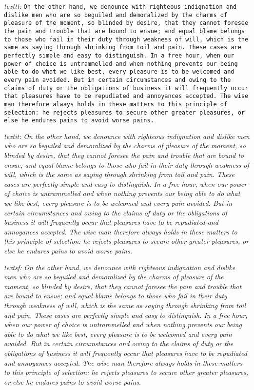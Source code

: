 \emph{texttt:}
\texttt{On the other hand, we denounce with righteous indignation and
  dislike men who are so beguiled and demoralized by the charms of
  pleasure of the moment, so blinded by desire, that they cannot
  foresee the pain and trouble that are bound to ensue; and equal
  blame belongs to those who fail in their duty through weakness of
  will, which is the same as saying through shrinking from toil and
  pain. These cases are perfectly simple and easy to distinguish. In a
  free hour, when our power of choice is untrammelled and when nothing
  prevents our being able to do what we like best, every pleasure is
  to be welcomed and every pain avoided. But in certain circumstances
  and owing to the claims of duty or the obligations of business it
  will frequently occur that pleasures have to be repudiated and
  annoyances accepted. The wise man therefore always holds in these
  matters to this principle of selection: he rejects pleasures to
  secure other greater pleasures, or else he endures pains to avoid
  worse pains.}

\emph{textit:}
\textit{On the other hand, we denounce with righteous indignation and
  dislike men who are so beguiled and demoralized by the charms of
  pleasure of the moment, so blinded by desire, that they cannot
  foresee the pain and trouble that are bound to ensue; and equal
  blame belongs to those who fail in their duty through weakness of
  will, which is the same as saying through shrinking from toil and
  pain. These cases are perfectly simple and easy to distinguish. In a
  free hour, when our power of choice is untrammelled and when nothing
  prevents our being able to do what we like best, every pleasure is
  to be welcomed and every pain avoided. But in certain circumstances
  and owing to the claims of duty or the obligations of business it
  will frequently occur that pleasures have to be repudiated and
  annoyances accepted. The wise man therefore always holds in these
  matters to this principle of selection: he rejects pleasures to
  secure other greater pleasures, or else he endures pains to avoid
  worse pains.} 

\emph{textsf:}
\textsl{On the other hand, we denounce with righteous indignation and
  dislike men who are so beguiled and demoralized by the charms of
  pleasure of the moment, so blinded by desire, that they cannot
  foresee the pain and trouble that are bound to ensue; and equal
  blame belongs to those who fail in their duty through weakness of
  will, which is the same as saying through shrinking from toil and
  pain. These cases are perfectly simple and easy to distinguish. In a
  free hour, when our power of choice is untrammelled and when nothing
  prevents our being able to do what we like best, every pleasure is
  to be welcomed and every pain avoided. But in certain circumstances
  and owing to the claims of duty or the obligations of business it
  will frequently occur that pleasures have to be repudiated and
  annoyances accepted. The wise man therefore always holds in these
  matters to this principle of selection: he rejects pleasures to
  secure other greater pleasures, or else he endures pains to avoid
  worse pains.}

